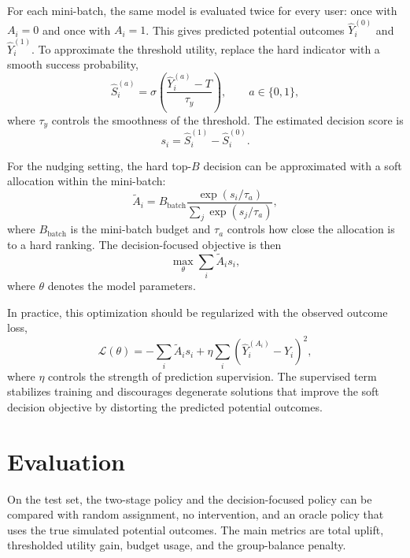 \documentclass[12pt]{article}
\begin{document}
For each mini-batch, the same model is evaluated twice for every user: once with $A_i = 0$ and once with $A_i = 1$. This gives predicted potential outcomes $\hat{Y}_i^{(0)}$ and $\hat{Y}_i^{(1)}$. To approximate the threshold utility, replace the hard indicator with a smooth success probability,
\[
\hat{S}_i^{(a)} =
\sigma\left(\frac{\hat{Y}_i^{(a)} - T}{\tau_y}\right),
\qquad a \in \{0,1\},
\]
where $\tau_y$ controls the smoothness of the threshold. The estimated decision score is
\[
s_i = \hat{S}_i^{(1)} - \hat{S}_i^{(0)}.
\]

For the nudging setting, the hard top-$B$ decision can be approximated with a soft allocation within the mini-batch:
\[
\tilde{A}_i = B_{\text{batch}}
\frac{\exp(s_i / \tau_a)}{\sum_j \exp(s_j / \tau_a)},
\]
where $B_{\text{batch}}$ is the mini-batch budget and $\tau_a$ controls how close the allocation is to a hard ranking. The decision-focused objective is then
\[
\max_\theta \sum_i \tilde{A}_i s_i,
\]
where $\theta$ denotes the model parameters.

In practice, this optimization should be regularized with the observed outcome loss,
\[
\mathcal{L}(\theta)
= -\sum_i \tilde{A}_i s_i
+ \eta \sum_i \left(\hat{Y}_i^{(A_i)} - Y_i\right)^2,
\]
where $\eta$ controls the strength of prediction supervision. The supervised term stabilizes training and discourages degenerate solutions that improve the soft decision objective by distorting the predicted potential outcomes.

\section{Evaluation}
On the test set, the two-stage policy and the decision-focused policy can be compared with random assignment, no intervention, and an oracle policy that uses the true simulated potential outcomes. The main metrics are total uplift, thresholded utility gain, budget usage, and the group-balance penalty. 




% 
\end{document}
